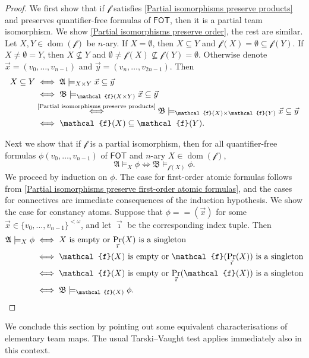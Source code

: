 \documentclass[a4paper]{amsart}
\theoremstyle{definition}
\theoremstyle{remark}
\newcommand{\A}{\mathcal{A}}
\newcommand{\B}{\mathcal{B}}
\DeclareMathOperator{\dep}{\mathop{=}}
\newcommand{\vx}{\vec{x}}
\newcommand{\vy}{\vec{y}}
\DeclareMathOperator{\dom}{dom}
\newcommand\fot{\mathsf{FOT}}
\theoremstyle{definition}
\renewcommand{\A}{\mathfrak{A}}
\renewcommand{\B}{\mathfrak{B}}
\newcommand{\f}{\mathcal{f}}
\begin{document}
\begin{proof}
    We first show that if $\f$ satisfies \ref{Partial isomorphisms preserve products} and preserves quantifier-free formulas of $\fot$, then it is a partial team isomorphism.
    We show \ref{Partial isomorphisms preserve order}, the rest are similar.
    Let $X,Y\in\dom(\f)$ be $n$-ary. If $X = \emptyset$, then $X\subseteq Y$ and $\f(X)=\emptyset\subseteq\f(Y)$. If $X\neq\emptyset = Y$, then $X\nsubseteq Y$ and $\emptyset\neq \f(X)\nsubseteq \f(Y) = \emptyset$.
    Otherwise denote $\vx = (v_0,\dots,v_{n-1})$ and $\vy = (v_n,\dots,v_{2n-1})$. Then
    \begin{align*}
        X\subseteq Y &\iff \A\models_{X\times Y} \vx\subseteq\vy \\
        &\iff \B\models_{\f(X\times Y)} \vx\subseteq\vy \\
        &\stackrel{\text{\ref{Partial isomorphisms preserve products}}}\iff \B\models_{\f(X)\times\f(Y)} \vx\subseteq\vy \\
        &\iff \f(X)\subseteq\f(Y).
    \end{align*}

    Next we show that if $\f$ is a partial isomorphism, then for all quantifier-free formulas $\phi(v_0,\dots,v_{n-1})$ of $\fot$ and $n$-ary $X\in\dom(\f)$,
    \[
        \A\models_X\phi \iff \B\models_{\f(X)}\phi.
    \]
    We proceed by induction on $\phi$.
    The case for first-order atomic formulas follows from \cref{Partial isomorphisms preserve first-order atomic formulas}, and the cases for connectives are immediate consequences of the induction hypothesis. We show the case for constancy atoms.
    Suppose that $\phi = \dep(\vx)$ for some $\vx\in\{v_0,\dots,v_{n-1}\}^{<\omega}$, and let $\vec\imath$ be the corresponding index tuple. Then
    \begin{align*}
        \A\models_X\phi &\iff \text{$X$ is empty or $\Pr_{\vec\imath}(X)$ is a singleton} \\
        &\iff \text{$\f(X)$ is empty or $\f(\Pr_{\vec\imath}(X))$ is a singleton} \\
        &\iff \text{$\f(X)$ is empty or $\Pr_{\vec\imath}(\f(X))$ is a singleton} \\
        &\iff \B\models_{\f(X)}\phi. \qedhere
    \end{align*}
\end{proof}

We conclude this section by pointing out some equivalent characterisations of elementary team maps. The usual Tarski--Vaught test applies immediately also in this context. 
\end{document}
